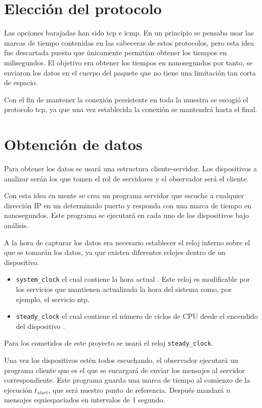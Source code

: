 \section{Elección del protocolo}

Las opciones barajadas han sido \acrfull{tcp} e \acrfull{icmp}. En un principio se pensaba usar las marcas de tiempo contenidas en las cabeceras de estos protocolos, pero esta idea fue descartada puesto que únicamente permitían obtener los tiempos en milisegundos. El objetivo era obtener los tiempos en nanosegundos por tanto, se enviaron los datos en el cuerpo del paquete que no tiene una limitación tan corta de espacio. 

Con el fin de mantener la conexión persistente en toda la muestra se escogió el protocolo \acrshort{tcp}, ya que una vez establecida la conexión se mantendrá hasta el final.

\section{Obtención de datos}

Para obtener los datos se usará una estructura cliente-servidor. Los dispositivos a analizar serán los que tomen el rol de servidores y el observador será el cliente.

Con esta idea en mente se crea un programa servidor que escuche a cualquier dirección IP en un determinado puerto y responda con una marca de tiempo en nanosegundos. Este programa se ejecutará en cada uno de los dispositivos bajo análisis.

A la hora de capturar los datos era necesario establecer el reloj interno sobre el que se tomarán los datos, ya que existen diferentes relojes dentro de un dispositivo.
\begin{itemize}
    \item \texttt{system\_clock} el cual contiene la hora actual \cite{systemclockcpp}. Este reloj es modificable por los servicios que mantienen actualizada la hora del sistema como, por ejemplo, el servicio \acrfull{ntp}.
    \item \texttt{steady\_clock} el cual contiene el número de ciclos de CPU desde el encendido del dispositivo \cite{steadyclockcpp}.
\end{itemize}

Para los cometidos de este proyecto se usará el reloj \texttt{steady\_clock}.

Una vez los dispositivos estén todos escuchando, el observador ejecutará un programa cliente que es el que se encargará de enviar los mensajes al servidor correspondiente. Este programa guarda una marca de tiempo al comienzo de la ejecución $t_{start}$, que será nuestro punto de referencia. Después mandará $n$ mensajes equiespaciados en intervalos de 1 segundo.

